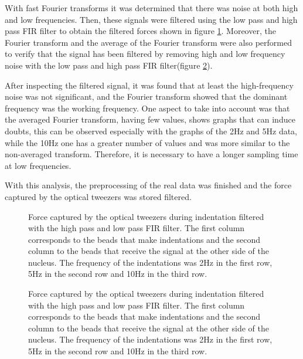 \documentclass[12pt, a4paper]{article} %
\begin{document}
	\newpage
	
	With fast Fourier transforms it was determined that there was noise at both high and low frequencies. Then, these signals were filtered using the low pass and high pass FIR filter to obtain the filtered forces shown in figure \ref{fig:filtered_data}. Moreover, the Fourier transform and the average of the Fourier transform were also performed to verify that the signal has been filtered by removing high and low frequency noise with the low pass and high pass FIR filter(figure \ref{fig:fourier_con_filtro_todo}).
	
	After inspecting the filtered signal, it was found that at least the high-frequency noise was not significant, and the Fourier transform showed that the dominant frequency was the working frequency. One aspect to take into account was that the averaged Fourier transform, having few values, shows graphs that can induce doubts, this can be observed especially with the graphs of the 2Hz and 5Hz data, while the 10Hz one has a greater number of values and was more similar to the non-averaged transform. Therefore, it is necessary to have a longer sampling time at low frequencies.
	
	With this analysis, the preprocessing of the real data was finished and the force captured by the optical tweezers was stored filtered.
	
	\begin{figure}[htbp]
		\centering
		
		\caption{Force captured by the optical tweezers during indentation filtered with the high pass and low pass FIR filter. The first column corresponds to the beads that make indentations and the second column to the beads that receive the signal at the other side of the nucleus. The frequency of the indentations was 2Hz in the first row, 5Hz in the second row and 10Hz in the third row.}
		\label{fig:filtered_data}
	\end{figure}
	\begin{figure}[H]
		\centering
		
		\caption{Force captured by the optical tweezers during indentation filtered with the high pass and low pass FIR filter. The first column corresponds to the beads that make indentations and the second column to the beads that receive the signal at the other side of the nucleus. The frequency of the indentations was 2Hz in the first row, 5Hz in the second row and 10Hz in the third row.}
		\label{fig:fourier_con_filtro_todo}
	\end{figure}
	
\end{document}
